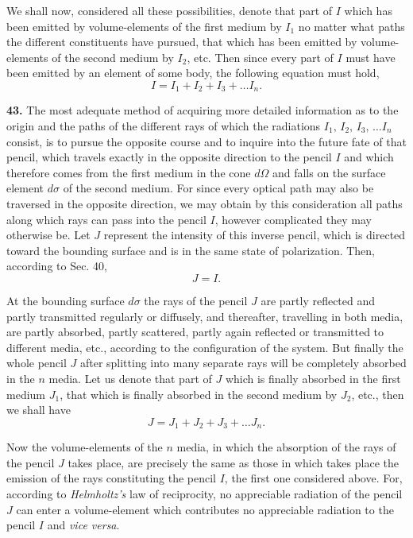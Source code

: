 \documentclass[12pt,oneside]{book}
\begin{document}
We shall now, considered all these possibilities, denote that part of $I$ which has been emitted by volume-elements of the first medium by $I_1$ no matter what paths the different constituents have pursued, that which has been emitted by volume-elements of the second medium by $I_2$, etc. Then since every part of $I$ must have been emitted by an element of some body, the following equation must hold,
\begin{equation}
    \label{eq44}
    I=I_1+I_2+I_3+\dots I_n.
\end{equation} \par

\textbf{43.} The most adequate method of acquiring more detailed information as to the origin and the paths of the different rays of which the radiations $I_1,\, I_2,\, I_3,\,\dots I_n$ consist, is to pursue the opposite course and to inquire into the future fate of that pencil, which travels exactly in the opposite direction to the pencil $I$ and which therefore comes from the first medium in the cone $d\Omega$ and falls on the surface element $d\sigma$ of the second medium. For since every optical path may also be traversed in the opposite direction, we may obtain by this consideration all paths along which rays can pass into the pencil $I$, however complicated they may otherwise be. Let $J$ represent the intensity of this inverse pencil, which is directed toward the bounding surface and is in the same state of polarization. Then, according to Sec. 40,
\begin{equation}
    \label{eq45}
    J=I.
\end{equation} \par

At the bounding surface $d\sigma$ the rays of the pencil $J$ are partly reflected and partly transmitted regularly or diffusely, and thereafter, travelling in both media, are partly absorbed, partly scattered, partly again reflected or transmitted to different media, etc., according to the configuration of the system. But finally the whole pencil $J$ after splitting into many separate rays will be completely absorbed in the $n$ media. Let us denote that part of $J$ which is finally absorbed in
the first medium $J_1$, that which is finally absorbed in the second medium by $J_2$, etc., then we shall have
\begin{equation}
  J=J_1+J_2+J_3+\dots J_n.
\end{equation} \par

Now the volume-elements of the $n$ media, in which the absorption of the rays of the pencil $J$ takes place, are precisely the same as those in which takes place the emission of the rays constituting the pencil $I$, the first one considered above. For, according to \textit{Helmholtz's} law of reciprocity, no appreciable radiation of the pencil $J$ can enter a volume-element which contributes no appreciable radiation to the pencil $I$ and \textit{vice versa}. \par
\end{document}
